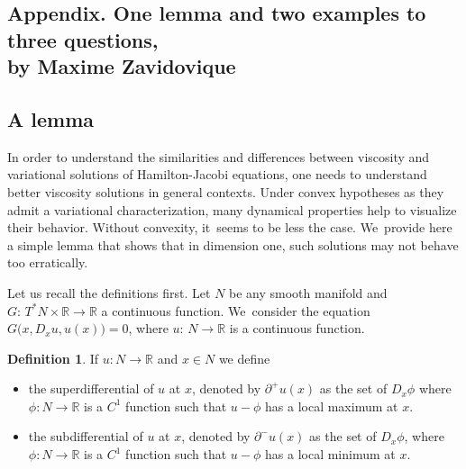 \documentclass[JEP,XML,SOM,Unicode,NoFloatCountersInSection,published]{cedram}
\theoremstyle{definition}
\newtheorem{defn}[thm]{Definition}
\newcommand{\R}{\mathbb{R}}
\begin{document}
\begin{appendix}
\bgroup
\renewcommand{\thefootnote}{*}
\section*{Appendix. One lemma and two examples to three questions,\\
by Maxime Zavidovique\texorpdfstring{\protect\footnotemark}{fn}}
\label{appendix}
\egroup
\setcounter{footnote}{7}

\subsection{A lemma}
In order to understand the similarities and differences between viscosity and variational solutions of Hamilton-Jacobi equations, one needs to understand better viscosity solutions in general contexts. Under convex hypotheses as they admit a variational characterization, many dynamical properties help to visualize their behavior. Without convexity, it~seems to be less the case. We~provide here a simple lemma that shows that in dimension one, such solutions may not behave too erratically.

Let us recall the definitions first. Let $N$ be any smooth manifold and \hbox{$G{:}\, T^*N\!\!\times\! \R \!\to\! \R$} a continuous function. We~consider the equation $G\bigl(x, D_x u ,u(x)\bigr)\!=\!0 $, where $u{:}\, N \!\to\! \R$ is a continuous function.

\begin{defn}\rm
If $u : N\to \R$ and $x \in N$ we define
\begin{itemize}
\item the superdifferential of $u$ at $x$, denoted by $\partial^+u(x)$ as the set of $D_x\phi$ where $\phi : N\to \R$ is a $C^1$ function such that $u-\phi$ has a local maximum at $x$.
\item
the subdifferential of $u$ at $x$, denoted by $\partial^-u(x)$ as the set of $D_x\phi$, where \hbox{$\phi : N\to \R$} is a $C^1$ function such that $u-\phi$ has a local minimum at $x$.

\end{itemize}
\end{defn}


\end{appendix}
\end{document}
